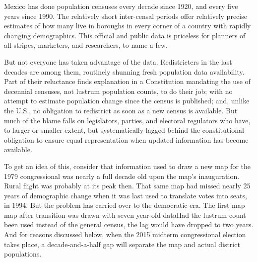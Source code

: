 \documentclass[letter,12pt]{article}
\begin{document}

\onehalfspacing

\noindent Mexico has done population censuses every decade since 1920, and every five years since 1990. The relatively short inter-censal periods offer relatively precise estimates of how many live in boroughs in every corner of a country with rapidly changing demographics. This official and public data is priceless for planners of all stripes, marketers, and researchers, to name a few. 

But not everyone has taken advantage of the data. Redistricters in the last decades are among them, routinely shunning fresh population data availability. Part of their reluctance finds explanation in a Constitution mandating the use of decennial censuses, not lustrum population counts, to do their job; with no attempt to estimate population change since the census is published; and, unlike the U.S., no obligation to redistrict as soon as a new census is available. But much of the blame falls on legislators, parties, and electoral regulators who have, to larger or smaller extent, but systematically lagged behind the constitutional obligation to ensure equal representation when updated information has become available. 

To get an idea of this, consider that information used to draw a new map for the 1979 congressional was nearly a full decade old upon the map's inauguration. Rural flight was probably at its peak then. That same map had missed nearly 25 years of demographic change when it was last used to translate votes into seats, in 1994. But the problem has carried over to the democratic era. The first map map after transition was drawn with seven year old dataHad the lustrum count been used instead of the general census, the lag would have dropped to two years. And for reasons discussed below, when the 2015 midterm congressional election takes place, a decade-and-a-half gap will separate the map and actual district populations. 
\end{document}
